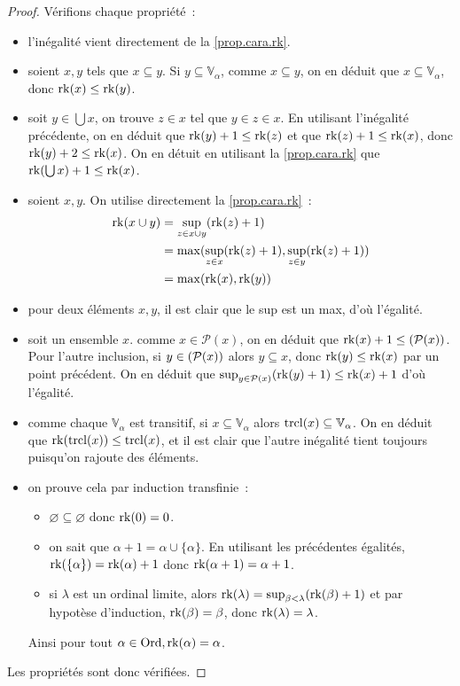 \begin{proof}
  Vérifions chaque propriété~:
  \begin{itemize}
  \item l'inégalité vient directement de la \cref{prop.cara.rk}.
  \item soient $x,y$ tels que $x\subseteq y$. Si $y\subseteq\mathbb V_\alpha$,
    comme $x\subseteq y$, on en déduit que $x\subseteq\mathbb V_\alpha$, donc
    $\operatorname{rk}(x)\leq \operatorname{rk}(y)$.
  \item soit $y\in \bigcup x$, on trouve $z\in x$ tel que $y\in z \in x$. En
    utilisant l'inégalité précédente, on en déduit que $\operatorname{rk}(y) + 1 \leq \operatorname{rk}(z)$
    et que $\operatorname{rk}(z) + 1 \leq \operatorname{rk}(x)$, donc $\operatorname{rk}(y) + 2 \leq \operatorname{rk}(x)$. On en détuit
    en utilisant la \cref{prop.cara.rk} que $\operatorname{rk}(\bigcup x) + 1 \leq \operatorname{rk}(x)$.
  \item soient $x,y$. On utilise directement la \cref{prop.cara.rk}~:
    \begin{align*}
      \operatorname{rk}(x\cup y) &= \sup_{z \in x \cup y} (\operatorname{rk}(z) + 1)\\
      &= \max(\sup_{z \in x} (\operatorname{rk}(z) + 1), \sup_{z\in y} (\operatorname{rk}(z) + 1))\\
      &= \max(\operatorname{rk}(x),\operatorname{rk}(y))
    \end{align*}
  \item pour deux éléments $x,y$, il est clair que le sup est un max, d'où
    l'égalité.
  \item soit un ensemble $x$. comme $x\in \mathcal P(x)$, on en déduit que
    $\operatorname{rk}(x) + 1 \leq \mathcal (\mathcal{P} (x))$. Pour l'autre inclusion, si
    $y\in \mathcal (\mathcal{P}(x))$ alors $y\subseteq x$, donc
    $\operatorname{rk}(y) \leq \operatorname{rk}(x)$ par un point précédent. On en déduit que
    $\sup_{y\in \mathcal{P}(x)} (\operatorname{rk}(y) + 1) \leq \operatorname{rk}(x) + 1$ d'où
    l'égalité.
  \item comme chaque $\mathbb V_\alpha$ est transitif, si
    $x\subseteq \mathbb V_\alpha$ alors $\operatorname{trcl}(x)\subseteq \mathbb V_\alpha$. On
    en déduit que $\operatorname{rk}(\operatorname{trcl}(x)) \leq \operatorname{trcl}(x)$, et il est clair que l'autre
    inégalité tient toujours puisqu'on rajoute des éléments.
  \item on prouve cela par induction transfinie~:
    \begin{itemize}
    \item $\varnothing \subseteq \varnothing$ donc $\operatorname{rk}(0) = 0$.
    \item on sait que $\alpha + 1 = \alpha \cup \{\alpha\}$. En utilisant les
      précédentes égalités, $\operatorname{rk}(\{\alpha\}) = \operatorname{rk}(\alpha) + 1$ donc
      $\operatorname{rk}(\alpha + 1) = \alpha + 1$.
    \item si $\lambda$ est un ordinal limite, alors
      $\operatorname{rk}(\lambda) = \sup_{\beta < \lambda} (\operatorname{rk}(\beta) + 1)$ et par hypotèse
      d'induction, $\operatorname{rk}(\beta) = \beta$, donc $\operatorname{rk}(\lambda) = \lambda$.
    \end{itemize}
    Ainsi pour tout $\alpha \in \operatorname{Ord}, \operatorname{rk}(\alpha) = \alpha$.
  \end{itemize}
  Les propriétés sont donc vérifiées.
\end{proof}

